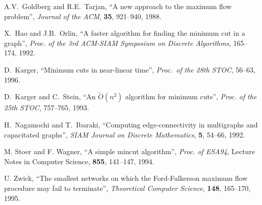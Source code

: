 \documentclass[12pt]{article}
\begin{document}
\begin{thebibliography}{99}

 A.V.\ Goldberg and R.E.\ Tarjan, ``A new
approach to the maximum flow problem'', {\it Journal of the ACM}, {\bf
35}, 921--940, 1988.

 X.\ Hao and J.B.\ Orlin, ``A faster algorithm for
finding the minimum cut in a graph'', {\it Proc. of the 3rd ACM-SIAM
Symposium on Discrete Algorithms}, 165--174, 1992. 

 D.\ Karger, ``Minimum cuts in near-linear time'',
{\it Proc.\ of the 28th STOC}, 56--63, 1996. 

 D.\ Karger and C.\ Stein, ``An $\tilde{O}(n^2)$
algorithm for minimum cuts'', {\it Proc. of the 25th STOC}, 757--765,
1993. 

 H.\ Nagamochi and T.\ Ibaraki, ``Computing
edge-connectivity in multigraphs and capacitated graphs'', {\it SIAM
Journal on Discrete Mathematics}, {\bf 5}, 54--66, 1992.

 M. Stoer and F. Wagner, ``A simple mincut
algorithm'', {\it Proc. of ESA94}, Lecture Notes in Computer Science,
{\bf 855}, 141--147, 1994. 

 U. Zwick, ``The smallest networks on which the Ford-Fulkerson maximum flow procedure may fail to terminate'', {\it Theoretical Computer Science}, {\bf 148}, 165--170, 1995. 

\end{thebibliography}

  
\end{document}
